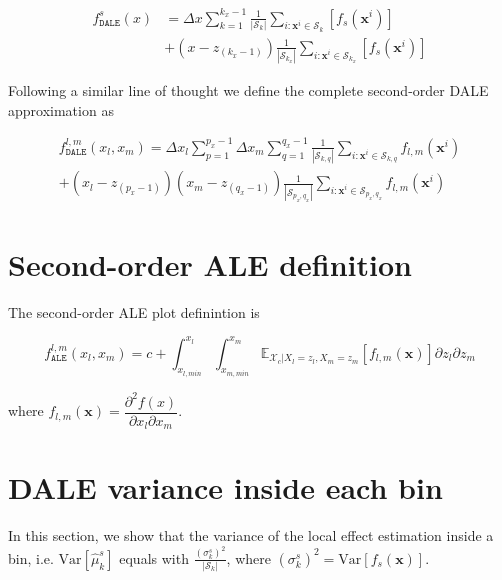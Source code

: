 \documentclass[wcp]{jmlr}
\newcommand{\Xc}{\mathcal{X}_c}
\newcommand{\xb}{\mathbf{x}}
\begin{document}
\begin{equation}
  \begin{split}
  f_{\mathtt{DALE}}^s(x) &= \Delta x \sum_{k=1}^{k_x-1} \frac{1}{|\mathcal{S}_k|}
  \sum_{i:\xb^i \in \mathcal{S}_k} [f_s(\xb^i)]\\
  & + (x-z_{(k_x-1)}) \frac{1}{|\mathcal{S}_{k_x}|} \sum_{i:\xb^i \in
    \mathcal{S}_{k_x}} [f_s(\xb^i)]
  \end{split}
  \label{eq:DALE_first_order_complete}
\end{equation}

\noindent
Following a similar line of thought we define the complete second-order DALE approximation as

\begin{multline}
  f_{\mathtt{DALE}}^{l,m}(x_l, x_m) = \Delta x_l\sum_{p=1}^{p_x-1} \Delta x_m\sum_{q=1}^{q_x-1} \frac{1}{|\mathcal{S}_{k,q}|} \sum_{i:\xb^i \in \mathcal{S}_{k,q}}f_{l,m}(\xb^i)\\
  + (x_l-z_{(p_x-1)})(x_m-z_{(q_x-1)}) \frac{1}{|\mathcal{S}_{p_x,q_x}|} \sum_{i:\xb^i \in \mathcal{S}_{p_x,q_x}}f_{l,m}(\xb^i)
 \label{eq:DALE_second_order_complete}
\end{multline}

\section{Second-order ALE definition}

The second-order ALE plot definintion is

\begin{equation}
  f_{\mathtt{ALE}}^{l,m}(x_l, x_m) = c + \int_{x_{l, min}}^{x_l} \int_{x_{m, min}}^{x_m} \mathbb{E}_{\Xc|X_l=z_l,
      X_m=z_m}[f_{l,m}(\xb)] \partial z_l \partial z_m
  \label{eq:ALE2}
\end{equation}

\noindent

where
\( f_{l,m}(\xb) = \dfrac{\partial^2f(x)}{\partial x_l \partial x_m} \).

\section{DALE variance inside each bin}

In this section, we show that the variance of the local effect
estimation inside a bin, i.e. \(\mathrm{Var}[\hat{\mu}_k^s]\) equals
with \(\frac{(\sigma_k^s)^2}{|\mathcal{S}_k|}\), where
\((\sigma_k^s)^2 = \mathrm{Var}[f_s(\mathbf{x})]\).
\end{document}
